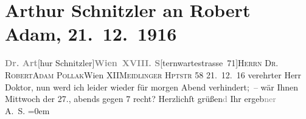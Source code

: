 

         
         \renewcommand{\erwaehntePersonen}{Personen: Robert Adam}
         \renewcommand{\erwaehnteOrte}{Orte: Meidlinger Hauptstraße, Sternwartestraße, Wien, XII., Meidling, XVIII., Währing}
         \renewcommand{\erwaehnteWerke}{}
               \section[Arthur Schnitzler an Robert Adam, 21. 12. 1916]{ Arthur Schnitzler an Robert Adam, 21. 12. 1916}\nopagebreak{}\rehead{ }\begin{ledgroupsized}[t]{13cm}\normalsize\beginnumbering \toendnotes[C]{\smallbreak\pagebreak[2]} 
\pstart{}{\pb}\textcolor{gray}{\textbf{Dr. Art}}{[}hur Schnitzler{]}\pend{}\pstart{}\textcolor{gray}{\textbf{Wien XVIII. S}}{[}ternwartestrasse 71{]}\pend{}{\bigskip}\pstart{}\textsc{Herrn Dr. Robert}\pend{}\pstart{}\textsc{Adam Pollak}\pend{}\pstart{}Wien XII\pend{}\pstart{}\textsc{Meidlinger Hptstr} 58\pend{}{\bigskip}\pstart
           \raggedleft{}{\pb}21. 12. 16\pend
           \pstart
           verehrter Herr Doktor, nun werd ich leider wieder für morgen Abend
               verhindert; – wär Ihnen Mittwoch der 27., abends gegen 7
               recht?\pend
           \pstart
           Herzlichſt grüßen\textcolor{gray}{d} Ihr ergeb\textcolor{gray}{ner}{\\[\baselineskip]}\spacefill\mbox{A. S.}\pend
           \leftskip=0em{}
         
         \endnumbering{}\end{ledgroupsized}  \newcommand{\dateiname}{L02252}\newcommand{\titel}{Arthur Schnitzler an Robert Adam, 21. 12. 1916}\newcommand{\editorInnen}{Martin Anton Müller und Gerd-Hermann Susen}
      